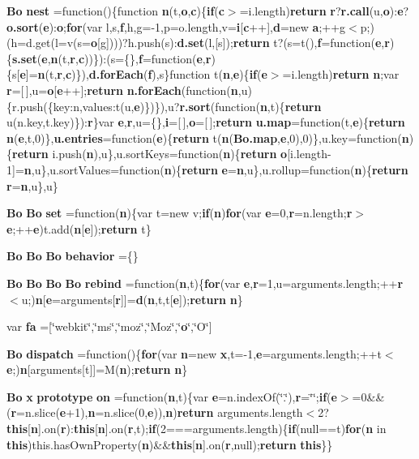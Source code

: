 \begin{DoxyCompactItemize}
{\bf Bo} {\bf nest} =function()\{function {\bf n}(t,{\bf o},{\bf c})\{{\bf if}({\bf c}$>$=i.\+length){\bf return} {\bf r}?{\bf r.\+call}(u,{\bf o})\+:{\bf e}?{\bf o.\+sort}({\bf e})\+:{\bf o};{\bf for}(var l,s,{\bf f},h,g=-\/1,p=o.\+length,v={\bf i}[{\bf c}++],{\bf d}=new {\bf a};++g$<$p;)(h=d.\+get(l=v(s={\bf o}[g])))?h.\+push(s)\+:{\bf d.\+set}(l,[s]);{\bf return} t?(s=t(),{\bf f}=function({\bf e},{\bf r})\{{\bf s.\+set}({\bf e},{\bf n}(t,{\bf r},{\bf c}))\})\+:(s=\{\},{\bf f}=function({\bf e},{\bf r})\{s[{\bf e}]={\bf n}(t,{\bf r},{\bf c})\}),{\bf d.\+for\+Each}({\bf f}),s\}function t({\bf n},{\bf e})\{{\bf if}({\bf e}$>$=i.\+length){\bf return} {\bf n};var {\bf r}=[$\,$],u={\bf o}[{\bf e}++];{\bf return} {\bf n.\+for\+Each}(function({\bf n},u)\{r.\+push(\{key\+:n,values\+:t(u,{\bf e})\})\}),u?{\bf r.\+sort}(function({\bf n},t)\{{\bf return} u(n.\+key,t.\+key)\})\+:{\bf r}\}var {\bf e},{\bf r},u=\{\},{\bf i}=[$\,$],{\bf o}=[$\,$];{\bf return} {\bf u.\+map}=function(t,{\bf e})\{{\bf return} {\bf n}({\bf e},t,0)\},{\bf u.\+entries}=function({\bf e})\{{\bf return} t({\bf n}({\bf Bo.\+map},{\bf e},0),0)\},u.\+key=function({\bf n})\{{\bf return} i.\+push({\bf n}),u\},u.\+sort\+Keys=function({\bf n})\{{\bf return} {\bf o}[i.\+length-\/1]={\bf n},u\},u.\+sort\+Values=function({\bf n})\{{\bf return} {\bf e}={\bf n},u\},u.\+rollup=function({\bf n})\{{\bf return} {\bf r}={\bf n},u\},u\}
\item 
{\bf Bo} {\bf Bo} {\bf set} =function({\bf n})\{var t=new v;{\bf if}({\bf n}){\bf for}(var {\bf e}=0,{\bf r}=n.\+length;{\bf r}$>${\bf e};++{\bf e})t.\+add({\bf n}[{\bf e}]);{\bf return} t\}
\item 
{\bf Bo} {\bf Bo} {\bf Bo} {\bf behavior} =\{\}
\item 
{\bf Bo} {\bf Bo} {\bf Bo} {\bf Bo} {\bf rebind} =function({\bf n},t)\{{\bf for}(var {\bf e},{\bf r}=1,u=arguments.\+length;++{\bf r}$<$u;){\bf n}[{\bf e}=arguments[{\bf r}]]={\bf d}({\bf n},t,t[{\bf e}]);{\bf return} {\bf n}\}
\item 
var {\bf fa} =[\char`\"{}webkit\char`\"{},\char`\"{}ms\char`\"{},\char`\"{}moz\char`\"{},\char`\"{}Moz\char`\"{},\char`\"{}{\bf o}\char`\"{},\char`\"{}O\char`\"{}]
\item 
{\bf Bo} {\bf dispatch} =function()\{{\bf for}(var {\bf n}=new {\bf x},t=-\/1,{\bf e}=arguments.\+length;++t$<${\bf e};){\bf n}[arguments[t]]=M({\bf n});{\bf return} {\bf n}\}
\item 
{\bf Bo} {\bf x} {\bf prototype} {\bf on} =function({\bf n},t)\{var {\bf e}=n.\+index\+Of(\char`\"{}.\char`\"{}),{\bf r}=\char`\"{}\char`\"{};{\bf if}({\bf e}$>$=0\&\&({\bf r}=n.\+slice({\bf e}+1),{\bf n}=n.\+slice(0,{\bf e})),{\bf n}){\bf return} arguments.\+length$<$2?{\bf this}[{\bf n}].on({\bf r})\+:{\bf this}[{\bf n}].on({\bf r},t);{\bf if}(2===arguments.\+length)\{{\bf if}(null==t){\bf for}({\bf n} in {\bf this})this.\+has\+Own\+Property({\bf n})\&\&{\bf this}[{\bf n}].on({\bf r},null);{\bf return} {\bf this}\}\}

\end{DoxyCompactItemize}

